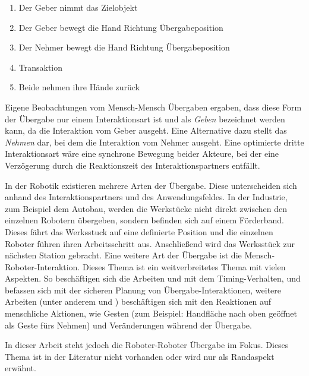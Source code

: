 \begin{enumerate}
	\item Der Geber nimmt das Zielobjekt
	\item Der Geber bewegt die Hand Richtung Übergabeposition
	\item Der Nehmer bewegt die Hand Richtung Übergabeposition
	\item Transaktion
	\item Beide nehmen ihre Hände zurück
\end{enumerate}

Eigene Beobachtungen vom Mensch-Mensch Übergaben ergaben, dass diese Form der Übergabe nur einem Interaktionsart ist und als \textit{Geben} bezeichnet werden kann, da die Interaktion vom Geber ausgeht. Eine Alternative dazu stellt das \textit{Nehmen} dar, bei dem die Interaktion vom Nehmer ausgeht. Eine optimierte dritte Interaktionsart wäre eine synchrone Bewegung beider Akteure, bei der eine Verzögerung durch die Reaktionszeit des Interaktionspartners entfällt.

In der Robotik existieren mehrere Arten der Übergabe. Diese unterscheiden sich anhand des Interaktionspartners und des Anwendungsfeldes. 
In der Industrie, zum Beispiel dem Autobau, werden die Werkstücke nicht direkt zwischen den einzelnen Robotern übergeben, sondern befinden sich auf einem Förderband. Dieses fährt das Werksstuck auf eine definierte Position und die einzelnen Roboter führen ihren Arbeitsschritt aus. Anschließend wird das Werksstück zur nächsten Station gebracht. Eine weitere Art der Übergabe ist die Mensch-Roboter-Interaktion. Dieses Thema ist ein weitverbreitetes Thema mit vielen Aspekten. So beschäftigen sich die Arbeiten \cite{huber2008human} und \cite{shibata1995experimental} mit dem Timing-Verhalten, \cite{mainprice2010planning} und \cite{kulic2005safe} befassen sich mit der sicheren Planung von Übergabe-Interaktionen, weitere Arbeiten (unter anderem \cite{prada2014implementation} und \cite{basiliapproach}) beschäftigen sich mit den Reaktionen auf menschliche Aktionen, wie Gesten (zum Beispiel: Handfläche nach oben geöffnet als Geste fürs Nehmen) und Veränderungen während der Übergabe.

In dieser Arbeit steht jedoch die Roboter-Roboter Übergabe im Fokus. Dieses Thema ist in der Literatur nicht vorhanden oder wird nur als Randaspekt erwähnt.